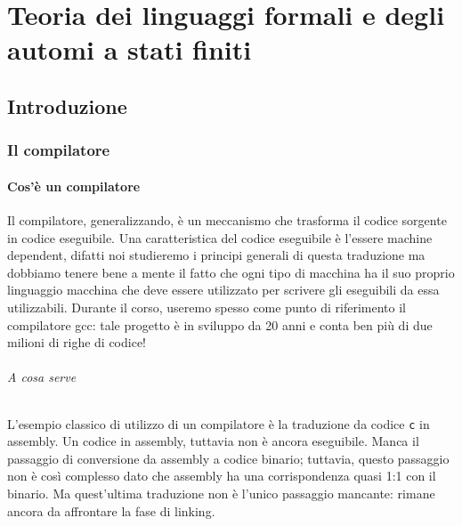 \documentclass[class=book, crop=false, oneside, 12pt]{standalone}
\begin{document}
\part[Teoria dei linguaggi e degli automi]{Teoria dei linguaggi formali e degli automi a stati finiti}
\chapter{Introduzione}

\section{Il compilatore}
\subsection{Cos'è un compilatore}
Il compilatore, generalizzando, è un meccanismo che trasforma il codice sorgente in codice eseguibile.
Una caratteristica del codice eseguibile è l'essere machine dependent, difatti noi studieremo i principi generali di questa traduzione ma dobbiamo tenere bene a mente il fatto che ogni tipo di macchina ha il suo proprio linguaggio macchina che deve essere utilizzato per scrivere gli eseguibili da essa utilizzabili. Durante il corso, useremo spesso come punto di riferimento il compilatore gcc: tale progetto è in sviluppo da 20 anni e conta ben più di due milioni di righe di codice!

\paragraph{A cosa serve}
L'esempio classico di utilizzo di un compilatore è la traduzione da codice \texttt{c} in assembly.
Un codice in assembly, tuttavia non è ancora eseguibile. Manca il passaggio di conversione da assembly a codice binario; tuttavia, questo passaggio non è così complesso dato che assembly ha una corrispondenza quasi 1:1 con il binario.
Ma quest'ultima traduzione non è l'unico passaggio mancante: rimane ancora da affrontare la fase di linking.
\end{document}
